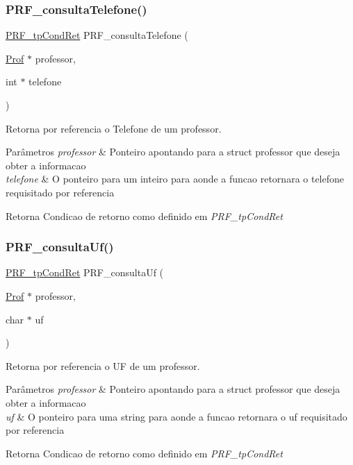 \subsubsection{\texorpdfstring{P\+R\+F\+\_\+consulta\+Telefone()}{PRF\_consultaTelefone()}}
{\footnotesize\ttfamily \hyperlink{group__modulo_professor_ga777e215896d573d2e99d98793b1f0ed1}{P\+R\+F\+\_\+tp\+Cond\+Ret} P\+R\+F\+\_\+consulta\+Telefone (\begin{DoxyParamCaption}\item[{\hyperlink{structprof}{Prof} $\ast$}]{professor,  }\item[{int $\ast$}]{telefone }\end{DoxyParamCaption})}



Retorna por referencia o Telefone de um professor. 


\begin{DoxyParams}{Parâmetros}
{\em professor} & Ponteiro apontando para a struct professor que deseja obter a informacao \\
\hline
{\em telefone} & O ponteiro para um inteiro para aonde a funcao retornara o telefone requisitado por referencia \\
\hline
\end{DoxyParams}
\begin{DoxyReturn}{Retorna}
Condicao de retorno como definido em {\itshape P\+R\+F\+\_\+tp\+Cond\+Ret} 
\end{DoxyReturn}
\mbox{\label{group__funcoes_consulta_gacda7cddf718a46f03b278817100758c2}} 
\subsubsection{\texorpdfstring{P\+R\+F\+\_\+consulta\+Uf()}{PRF\_consultaUf()}}
{\footnotesize\ttfamily \hyperlink{group__modulo_professor_ga777e215896d573d2e99d98793b1f0ed1}{P\+R\+F\+\_\+tp\+Cond\+Ret} P\+R\+F\+\_\+consulta\+Uf (\begin{DoxyParamCaption}\item[{\hyperlink{structprof}{Prof} $\ast$}]{professor,  }\item[{char $\ast$}]{uf }\end{DoxyParamCaption})}



Retorna por referencia o UF de um professor. 


\begin{DoxyParams}{Parâmetros}
{\em professor} & Ponteiro apontando para a struct professor que deseja obter a informacao \\
\hline
{\em uf} & O ponteiro para uma string para aonde a funcao retornara o uf requisitado por referencia \\
\hline
\end{DoxyParams}
\begin{DoxyReturn}{Retorna}
Condicao de retorno como definido em {\itshape P\+R\+F\+\_\+tp\+Cond\+Ret} 
\end{DoxyReturn}
